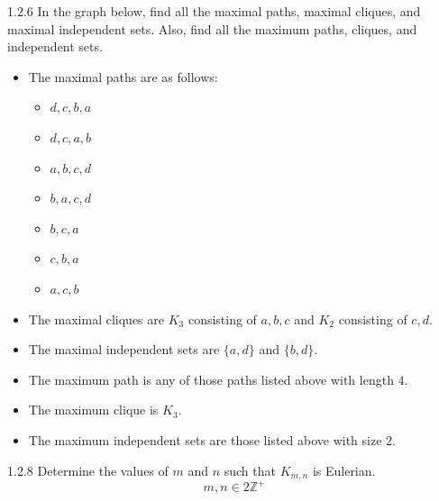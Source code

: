 \documentclass[9pt]{extarticle}
\begin{document}
\begin{problem}{1.2.6}
  In the graph below, find all the maximal paths, maximal cliques, and maximal independent sets. Also, find all the maximum paths, cliques, and independent sets. 
    \begin{center}
    \end{center}
    \tcblower
  \begin{itemize}
      \item The maximal paths are as follows:
     \begin{itemize}
       \item $d,c,b,a$
       \item $d,c,a,b$
       \item $a,b,c,d$
       \item $b,a,c,d$
       \item $b,c,a$
       \item $c,b,a$
       \item $a,c,b$
     \end{itemize}
   \item The maximal cliques are $K_3$ consisting of $a,b,c$ and $K_2$ consisting of $c,d$.
   \item The maximal independent sets are $\{a,d\}$ and  $\{b,d\}$.
   \item The maximum path is any of those paths listed above with length $4$.
   \item The maximum clique is $K_3$.
   \item The maximum independent sets are those listed above with size $2$.
  \end{itemize}
\end{problem}
\begin{problem}{1.2.8}
  Determine the values of $m$ and $n$ such that $K_{m,n}$ is Eulerian. 
  \tcblower
  \[
    m,n\in 2\mathbb{Z}^{+}
  \]
\end{problem}
\end{document}
